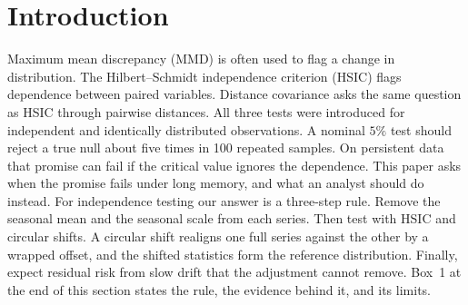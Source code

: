\documentclass[11pt]{article}
\theoremstyle{remark}
\begin{document}
\section{Introduction}
Maximum mean discrepancy (MMD) \citep{gretton2012kernel} is often used to flag a change in distribution. The Hilbert--Schmidt independence criterion (HSIC) \citep{gretton2008kernel} flags dependence between paired variables. Distance covariance \citep{szekely2007dcov} asks the same question as HSIC through pairwise distances. All three tests were introduced for independent and identically distributed observations. A nominal $5\%$ test should reject a true null about five times in 100 repeated samples. On persistent data that promise can fail if the critical value ignores the dependence. This paper asks when the promise fails under long memory, and what an analyst should do instead. For independence testing our answer is a three-step rule. Remove the seasonal mean and the seasonal scale from each series. Then test with HSIC and circular shifts. A circular shift realigns one full series against the other by a wrapped offset, and the shifted statistics form the reference distribution. Finally, expect residual risk from slow drift that the adjustment cannot remove. Box~1 at the end of this section states the rule, the evidence behind it, and its limits.
\end{document}

